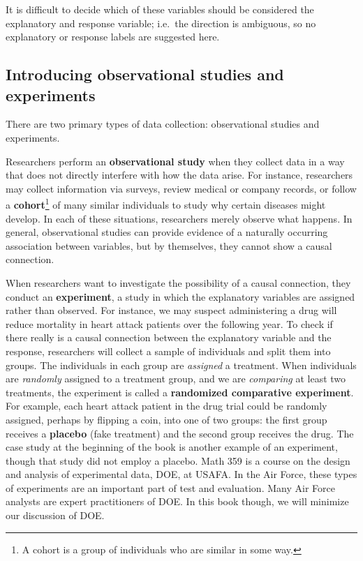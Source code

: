 \documentclass[
  letterpaper,
  DIV=11,
  numbers=noendperiod]{scrreprt}
\begin{document}
It is difficult to decide which of these variables should be considered
the explanatory and response variable; i.e.~the direction is ambiguous,
so no explanatory or response labels are suggested here.

\subsection{Introducing observational studies and
experiments}\label{introducing-observational-studies-and-experiments}

There are two primary types of data collection: observational studies
and experiments.

Researchers perform an \textbf{observational study} when they collect
data in a way that does not directly interfere with how the data arise.
For instance, researchers may collect information via surveys, review
medical or company records, or follow a \textbf{cohort}\footnote{A
  cohort is a group of individuals who are similar in some way.} of many
similar individuals to study why certain diseases might develop. In each
of these situations, researchers merely observe what happens. In
general, observational studies can provide evidence of a naturally
occurring association between variables, but by themselves, they cannot
show a causal connection.

When researchers want to investigate the possibility of a causal
connection, they conduct an \textbf{experiment}, a study in which the
explanatory variables are assigned rather than observed. For instance,
we may suspect administering a drug will reduce mortality in heart
attack patients over the following year. To check if there really is a
causal connection between the explanatory variable and the response,
researchers will collect a sample of individuals and split them into
groups. The individuals in each group are \emph{assigned} a treatment.
When individuals are \emph{randomly} assigned to a treatment group, and
we are \emph{comparing} at least two treatments, the experiment is
called a \textbf{randomized comparative experiment}. For example, each
heart attack patient in the drug trial could be randomly assigned,
perhaps by flipping a coin, into one of two groups: the first group
receives a \textbf{placebo} (fake treatment) and the second group
receives the drug. The case study at the beginning of the book is
another example of an experiment, though that study did not employ a
placebo. Math 359 is a course on the design and analysis of experimental
data, DOE, at USAFA. In the Air Force, these types of experiments are an
important part of test and evaluation. Many Air Force analysts are
expert practitioners of DOE. In this book though, we will minimize our
discussion of DOE.
\end{document}
